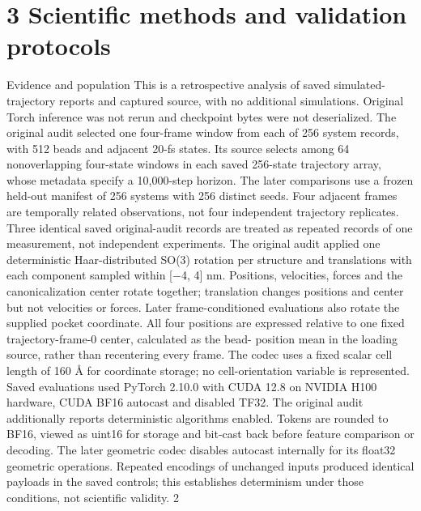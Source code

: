 \documentclass[11pt]{article}
\begin{document}
\section*{3 Scientific methods and validation protocols}

Evidence and population
This is a retrospective analysis of saved simulated-trajectory reports and captured source, with
no additional simulations. Original Torch inference was not rerun and checkpoint bytes were not
deserialized. The original audit selected one four-frame window from each of 256 system records,
with 512 beads and adjacent 20-fs states. Its source selects among 64 nonoverlapping four-state
windows in each saved 256-state trajectory array, whose metadata specify a 10,000-step horizon.
The later comparisons use a frozen held-out manifest of 256 systems with 256 distinct seeds. Four
adjacent frames are temporally related observations, not four independent trajectory replicates.
Three identical saved original-audit records are treated as repeated records of one measurement,
not independent experiments.
The original audit applied one deterministic Haar-distributed SO(3) rotation per structure and
translations with each component sampled within [\ensuremath{-}4, 4] nm. Positions, velocities, forces and the
canonicalization center rotate together; translation changes positions and center but not velocities
or forces. Later frame-conditioned evaluations also rotate the supplied pocket coordinate. All
four positions are expressed relative to one fixed trajectory-frame-0 center, calculated as the bead-
position mean in the loading source, rather than recentering every frame. The codec uses a fixed
scalar cell length of 160 Å for coordinate storage; no cell-orientation variable is represented.
Saved evaluations used PyTorch 2.10.0 with CUDA 12.8 on NVIDIA H100 hardware, CUDA
BF16 autocast and disabled TF32. The original audit additionally reports deterministic algorithms
enabled. Tokens are rounded to BF16, viewed as uint16 for storage and bit-cast back before feature
comparison or decoding. The later geometric codec disables autocast internally for its float32
geometric operations. Repeated encodings of unchanged inputs produced identical payloads in the
saved controls; this establishes determinism under those conditions, not scientific validity.
2
\end{document}
